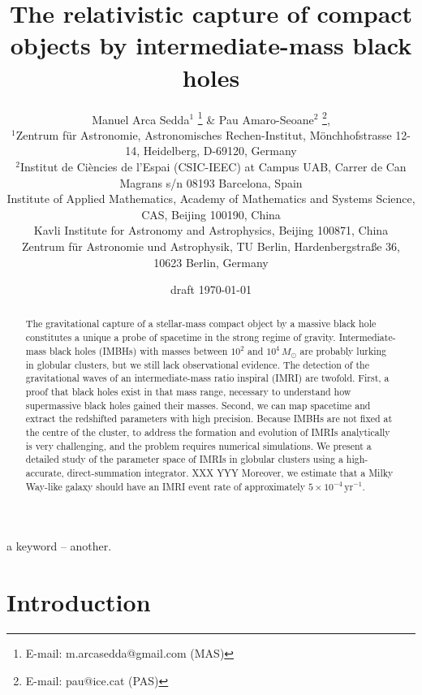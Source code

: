 \documentclass[useAMS,usenatbib]{mn2e}
\title[Formation of intermediate-mass ratio inspirals]
      {The relativistic capture of compact objects by intermediate-mass black holes}
\author[M. Arca Sedda \& P. Amaro-Seoane] %
{
Manuel Arca Sedda$^{1}$
                        \thanks{E-mail: m.arcasedda@gmail.com (MAS)} \&
Pau Amaro-Seoane$^{2}$
                        \thanks{E-mail: pau@ice.cat (PAS)},
   \\
$^{1}$Zentrum f\"{u}r Astronomie, Astronomisches Rechen-Institut, M\"onchhofstrasse 12-14, Heidelberg, D-69120, Germany\\
$^{2}$Institut de Ci{\`e}ncies de l'Espai (CSIC-IEEC) at Campus UAB,
Carrer de Can Magrans s/n 08193 Barcelona, Spain\\
Institute of Applied Mathematics, Academy of Mathematics and Systems Science,
CAS, Beijing 100190, China\\
Kavli Institute for Astronomy and Astrophysics, Beijing 100871, China\\
Zentrum f{\"u}r Astronomie und Astrophysik, TU Berlin, Hardenbergstra{\ss}e 36,
10623 Berlin, Germany
}
\begin{document}
\date{draft \today}

\pagerange{\pageref{firstpage}--\pageref{lastpage}} \pubyear{}

\maketitle

\label{firstpage}

\begin{abstract}
%
%
The gravitational capture of a stellar-mass compact object by a 
massive black hole constitutes a unique a probe of spacetime in the
strong regime of gravity.
%
%
Intermediate-mass black holes (IMBHs) with masses between $10^2$ and
$10^4\,M_{\odot}$ are probably lurking in globular clusters, but we still lack
observational evidence.  The detection of the gravitational waves of an
intermediate-mass ratio inspiral (IMRI) are twofold. First, a proof that black
holes exist in that mass range, necessary to understand how supermassive black
holes gained their masses.  Second, we can map spacetime and extract the
redshifted parameters with high precision.
%
%
Because IMBHs are not fixed at the centre of the cluster, to address the
formation and evolution of IMRIs analytically is very challenging, and the
problem requires numerical simulations. We present a detailed study of the
parameter space of IMRIs in globular clusters using a high-accurate,
direct-summation integrator.
%
%
XXX
%
%
YYY
Moreover, we estimate that a Milky Way-like galaxy should have an IMRI event rate of approximately
$5\times 10^{-4}\,\textrm{yr}^{-1}$.
\end{abstract}

\begin{keywords}
a keyword -- another.
\end{keywords}


\section{Introduction}
\end{document}
